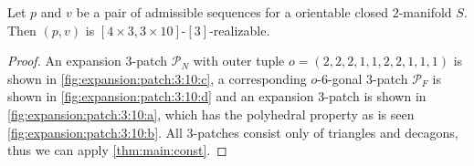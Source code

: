 \clearpage
\begin{theorem}
  Let $p$ and $v$ be a pair of admissible sequences for a orientable closed $2$-manifold $S$. Then $(p, v)$ is $[4 \times 3, 3 \times 10]$-$[3]$-realizable.
  \begin{proof}
    An expansion $3$-patch $\mathcal{P}_N$ with outer tuple $o = (2, 2, 2, 1, 1, 2, 2, 1, 1, 1)$ is shown in \autoref{fig:expansion:patch:3:10:c}, a corresponding $o$-$6$-gonal $3$-patch $\mathcal{P}_F$ is shown in \autoref{fig:expansion:patch:3:10:d} and an expansion $3$-patch is shown in \autoref{fig:expansion:patch:3:10:a}, which has the polyhedral property as is seen \autoref{fig:expansion:patch:3:10:b}. All $3$-patches consist only of triangles and decagons, thus we can apply \autoref{thm:main:const}.
  \end{proof}
\end{theorem}
{\par\vspace*{\fill}}
